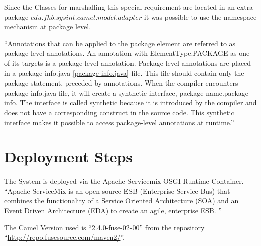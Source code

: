 \documentclass[11pt,english,ngerman, headsepline]{scrreprt}
\begin{document}


Since the Classes for marshalling this special requirement are located in an
extra package $edu.fhb.sysint.camel.model.adapter$ it was possible to use the
namespace mechanism at package level. 


``Annotations that can be applied to the
package element are referred to as package-level annotations. An annotation with
ElementType.PACKAGE as one of its targets is a package-level annotation.
Package-level annotations are placed in a package-info.java
\ref{package-info.java} file. This file should contain only the package statement, preceded by annotations. When the
compiler encounters package-info.java file, it will create a synthetic
interface, package-name.package-info. The interface is called synthetic because
it is introduced by the compiler and does not have a corresponding construct in
the source code. This synthetic interface makes it possible to access
package-level annotations at runtime.\cite{packageinfo}''









\chapter{Deployment Steps}
The System is deployed via the Apache Servicemix OSGI Runtime Container.
``Apache ServiceMix is an open source ESB (Enterprise Service Bus) that combines
 the functionality of a Service Oriented Architecture (SOA) and an Event Driven
 Architecture (EDA)  to create an agile, enterprise ESB.\cite{sm} ''
 
The Camel Version used is ``2.4.0-fuse-02-00'' from the repository
``\url{http://repo.fusesource.com/maven2/}''.
\end{document}
